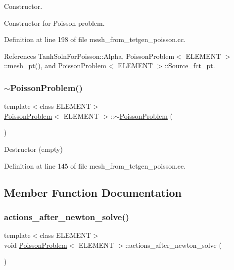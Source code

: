 Constructor. 

Constructor for Poisson problem. 

Definition at line 198 of file mesh\+\_\+from\+\_\+tetgen\+\_\+poisson.\+cc.



References Tanh\+Soln\+For\+Poisson\+::\+Alpha, Poisson\+Problem$<$ E\+L\+E\+M\+E\+N\+T $>$\+::mesh\+\_\+pt(), and Poisson\+Problem$<$ E\+L\+E\+M\+E\+N\+T $>$\+::\+Source\+\_\+fct\+\_\+pt.

\mbox{\label{classPoissonProblem_ac247e42d2d292200617f4b9db7ed1ab8}} 
\subsubsection{\texorpdfstring{$\sim$\+Poisson\+Problem()}{~PoissonProblem()}}
{\footnotesize\ttfamily template$<$class E\+L\+E\+M\+E\+NT$>$ \\
\hyperlink{classPoissonProblem}{Poisson\+Problem}$<$ E\+L\+E\+M\+E\+NT $>$\+::$\sim$\hyperlink{classPoissonProblem}{Poisson\+Problem} (\begin{DoxyParamCaption}{ }\end{DoxyParamCaption})\hspace{0.3cm}{\ttfamily [inline]}}



Destructor (empty) 



Definition at line 145 of file mesh\+\_\+from\+\_\+tetgen\+\_\+poisson.\+cc.



\subsection{Member Function Documentation}
\mbox{\label{classPoissonProblem_a7a9478d8e1e5c7d3a886b00ab7d50bbd}} 
\subsubsection{\texorpdfstring{actions\+\_\+after\+\_\+newton\+\_\+solve()}{actions\_after\_newton\_solve()}}
{\footnotesize\ttfamily template$<$class E\+L\+E\+M\+E\+NT$>$ \\
void \hyperlink{classPoissonProblem}{Poisson\+Problem}$<$ E\+L\+E\+M\+E\+NT $>$\+::actions\+\_\+after\+\_\+newton\+\_\+solve (\begin{DoxyParamCaption}{ }\end{DoxyParamCaption})\hspace{0.3cm}{\ttfamily [inline]}}




